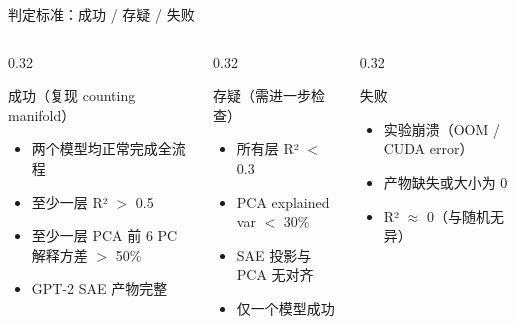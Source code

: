 % 

\begin{frame}{判定标准：成功 / 存疑 / 失败}
\small
\begin{columns}[T,onlytextwidth]
\begin{column}{0.32\linewidth}
\begin{block}{成功（复现 counting manifold）}
\begin{itemize}
  \item 两个模型均正常完成全流程
  \item 至少一层 R² $>$ 0.5
  \item 至少一层 PCA 前 6 PC 解释方差 $>$ 50\%
  \item GPT-2 SAE 产物完整
\end{itemize}
\end{block}
\end{column}
\begin{column}{0.32\linewidth}
\begin{block}{存疑（需进一步检查）}
\begin{itemize}
  \item 所有层 R² $<$ 0.3
  \item PCA explained var $<$ 30\%
  \item SAE 投影与 PCA 无对齐
  \item 仅一个模型成功
\end{itemize}
\end{block}
\end{column}
\begin{column}{0.32\linewidth}
\begin{block}{失败}
\begin{itemize}
  \item 实验崩溃（OOM / CUDA error）
  \item 产物缺失或大小为 0
  \item R² $\approx$ 0（与随机无异）
\end{itemize}
\end{block}
\end{column}
\end{columns}
\end{frame}

